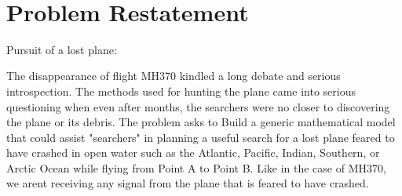 \documentclass[12pt, letterpaper]{article}  %
\theoremstyle{definition}
\theoremstyle{remark}
\theoremstyle{plain}
\begin{document}




\newpage



   \doublespacing


\tableofcontents
\ \\



\newpage

\setcounter{page}{1}   




\section{Problem Restatement}\label{sec:restate}


Pursuit of a lost plane:

The disappearance of flight MH370 kindled a long debate and serious introspection. The methods used for hunting the plane came into serious questioning when even after months, the searchers were no closer to discovering the plane or its debris. 
The problem asks to Build a generic mathematical model that could assist "searchers" in planning a useful search for a lost plane feared to have crashed in open water such as the Atlantic, Pacific, Indian, Southern, or Arctic Ocean while flying from Point A to Point B. Like in the case of MH370, we arent receiving any signal from the plane that is feared to have crashed. 
\end{document}
